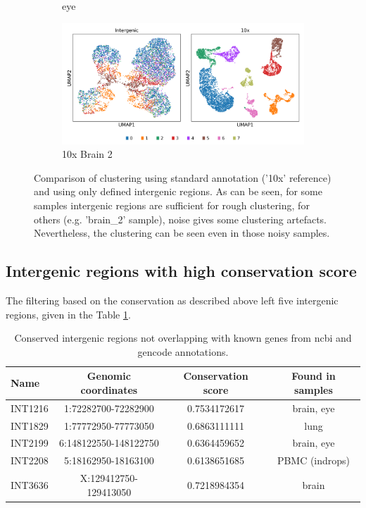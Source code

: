 \begin{figure}[htbp]
\begin{subfigure}{0.45\textwidth}
        \caption{eye}
    \end{subfigure}
    \hfill
    \begin{subfigure}{0.45\textwidth}
        \centering
        \includegraphics[width=\textwidth]{images/umaps/intergenic_10x_brain_2.png}
        \caption{10x Brain 2}
    \end{subfigure}
    \caption{Comparison of clustering using standard annotation ('10x' reference) and using only defined intergenic regions.
    As can be seen, for some samples intergenic regions are sufficient for rough clustering, for others (e.g. 'brain\_2' sample), 
    noise gives some clustering artefacts.
    Nevertheless, the clustering can be seen even in those noisy samples.}
    \label{fig:intergenicClustering}
\end{figure}

\subsection{Intergenic regions with high conservation score}

The filtering based on the conservation as described above left five intergenic regions, given in the Table \ref{tab:conservedIntergenic}.

\begin{table}[h]
    \centering
    \begin{tabular}{lccc}
        \toprule
        Name & Genomic coordinates & Conservation score & Found in samples \\
        \midrule
        INT1216 & 1:72282700-72282900 & 0.7534172617 & brain, eye\\
	INT1829 & 1:77772950-77773050 & 0.6863111111 & lung \\
	INT2199 & 6:148122550-148122750 & 0.6364459652 & brain, eye \\
	INT2208 & 5:18162950-18163100 & 0.6138651685 & PBMC (indrops) \\
	INT3636 & X:129412750-129413050 & 0.7218984354 & brain \\
        \bottomrule
    \end{tabular}
    \caption{Conserved intergenic regions not overlapping with known genes from ncbi and gencode annotations.}
    \label{tab:conservedIntergenic}
\end{table}

